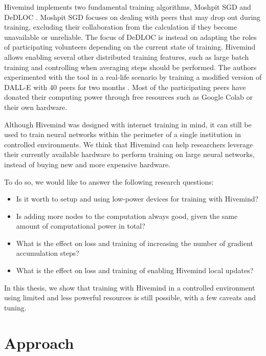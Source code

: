 Hivemind implements two fundamental training algorithms, Moshpit SGD \cite{DBLP:journals/corr/abs-2103-03239} and DeDLOC \cite{DBLP:journals/corr/abs-2106-10207}.
Moshpit SGD focuses on dealing with peers that may drop out during training, excluding their collaboration from the calculation if they become unavailable or unreliable.
The focus of DeDLOC is instead on adapting the roles of participating volunteers depending on the current state of training.
Hivemind allows enabling several other distributed training features, such as large batch training \cite{goyal2017accurate} and controlling when averaging steps should be performed.
The authors experimented with the tool in a real-life scenario by training a modified version of DALL-E \cite{ramesh2021zero} with 40 peers for two months \cite{learning30:online}.
Most of the participating peers have donated their computing power through free resources such as Google Colab or their own hardware.

Although Hivemind was designed with internet training in mind, it can still be used to train neural networks within the perimeter of a single institution in controlled environments.
We think that Hivemind can help researchers leverage their currently available hardware to perform training on large neural networks, instead of buying new and more expensive hardware.

To do so, we would like to answer the following research questions:
\begin{itemize}
    \item Is it worth to setup and using low-power devices for training with Hivemind?
    \item Is adding more nodes to the computation always good, given the same amount of computational power in total?
    \item What is the effect on loss and training of increasing the number of gradient accumulation steps?
    \item What is the effect on loss and training of enabling Hivemind local updates?
\end{itemize}

In this thesis, we show that training with Hivemind in a controlled environment using limited and less powerful resources is still possible, with a few caveats and tuning.

\section{Approach}

